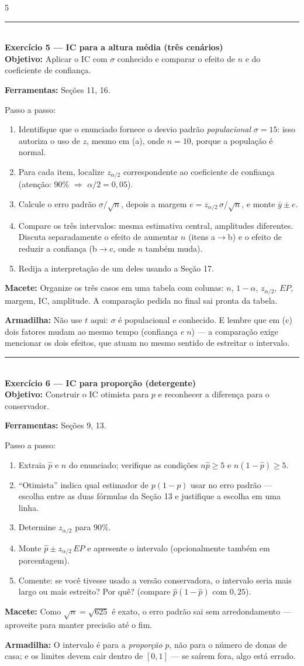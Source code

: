 \documentclass[a4paper,8pt]{extarticle}
\newcommand{\tit}[1]{\vspace{2pt}\textcolor{azul}{\rule{\linewidth}{0.6pt}}\\[1pt]\textbf{\textcolor{azul}{#1}}\\[1pt]}
\newcommand{\mac}[1]{\textcolor{verde}{\textbf{Macete:}} #1\par}
\newcommand{\arm}[1]{\textcolor{vinho}{\textbf{Armadilha:}} #1\par}
\newcommand{\ferr}[1]{\textbf{Ferramentas:} #1\par}
\newcommand{\obj}[1]{\textbf{Objetivo:} #1\par}
\begin{document}
\begin{multicols*}{5}
\tit{Exercício 5 — IC para a altura média (três cenários)}
\obj{Aplicar o IC com $\sigma$ conhecido e comparar o efeito de $n$ e do coeficiente de confiança.}
\ferr{Seções 11, 16.}
Passo a passo:
\begin{enumerate}
\item Identifique que o enunciado fornece o desvio padrão \emph{populacional} $\sigma=15$: isso autoriza o uso de $z$, mesmo em (a), onde $n=10$, porque a população é normal.
\item Para cada item, localize $z_{\alpha/2}$ correspondente ao coeficiente de confiança (atenção: 90\% $\Rightarrow$ $\alpha/2=0{,}05$).
\item Calcule o erro padrão $\sigma/\sqrt n$, depois a margem $e=z_{\alpha/2}\,\sigma/\sqrt n$, e monte $\bar y\pm e$.
\item Compare os três intervalos: mesma estimativa central, amplitudes diferentes. Discuta separadamente o efeito de aumentar $n$ (itens a$\to$b) e o efeito de reduzir a confiança (b$\to$c, onde $n$ também muda).
\item Redija a interpretação de um deles usando a Seção 17.
\end{enumerate}
\mac{Organize os três casos em uma tabela com colunas: $n$, $1-\alpha$, $z_{\alpha/2}$, $EP$, margem, IC, amplitude. A comparação pedida no final sai pronta da tabela.}
\arm{Não use $t$ aqui: $\sigma$ é populacional e conhecido. E lembre que em (c) dois fatores mudam ao mesmo tempo (confiança \emph{e} $n$) — a comparação exige mencionar os dois efeitos, que atuam no mesmo sentido de estreitar o intervalo.}

\tit{Exercício 6 — IC para proporção (detergente)}
\obj{Construir o IC otimista para $p$ e reconhecer a diferença para o conservador.}
\ferr{Seções 9, 13.}
Passo a passo:
\begin{enumerate}
\item Extraia $\hat p$ e $n$ do enunciado; verifique as condições $n\hat p\ge5$ e $n(1-\hat p)\ge5$.
\item “Otimista” indica qual estimador de $p(1-p)$ usar no erro padrão — escolha entre as duas fórmulas da Seção 13 e justifique a escolha em uma linha.
\item Determine $z_{\alpha/2}$ para 90\%.
\item Monte $\hat p\pm z_{\alpha/2}\,EP$ e apresente o intervalo (opcionalmente também em porcentagem).
\item Comente: se você tivesse usado a versão conservadora, o intervalo seria mais largo ou mais estreito? Por quê? (compare $\hat p(1-\hat p)$ com $0{,}25$).
\end{enumerate}
\mac{Como $\sqrt{n}=\sqrt{625}$ é exato, o erro padrão sai sem arredondamento — aproveite para manter precisão até o fim.}
\arm{O intervalo é para a \emph{proporção} $p$, não para o número de donas de casa; e os limites devem cair dentro de $[0,1]$ — se saírem fora, algo está errado.}


\end{multicols*}
\end{document}
